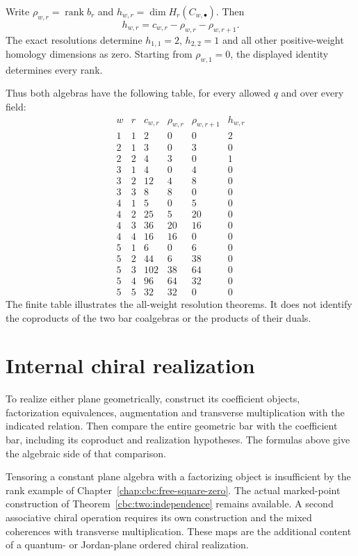 Write $\rho_{w,r}=\operatorname{rank}b_r$ and $h_{w,r}=\dim H_r(C_{w,\bullet})$.
Then
\[
 h_{w,r}=c_{w,r}-\rho_{w,r}-\rho_{w,r+1}.
\]
The exact resolutions determine $h_{1,1}=2$, $h_{2,2}=1$ and all other positive-weight homology dimensions as zero.
Starting from $\rho_{w,1}=0$, the displayed identity determines every rank.

Thus both algebras have the following table, for every allowed $q$ and over every field:
\[
\begin{array}{cc|rrrr}
 w&r&c_{w,r}&\rho_{w,r}&\rho_{w,r+1}&h_{w,r}\\ \hline
 1&1&2&0&0&2\\
 2&1&3&0&3&0\\
 2&2&4&3&0&1\\
 3&1&4&0&4&0\\
 3&2&12&4&8&0\\
 3&3&8&8&0&0\\
 4&1&5&0&5&0\\
 4&2&25&5&20&0\\
 4&3&36&20&16&0\\
 4&4&16&16&0&0\\
 5&1&6&0&6&0\\
 5&2&44&6&38&0\\
 5&3&102&38&64&0\\
 5&4&96&64&32&0\\
 5&5&32&32&0&0
\end{array}
\]
The finite table illustrates the all-weight resolution theorems.
It does not identify the coproducts of the two bar coalgebras or the products of their duals.

\section{Internal chiral realization}

To realize either plane geometrically, construct its coefficient objects, factorization equivalences, augmentation and transverse multiplication with the indicated relation.
Then compare the entire geometric bar with the coefficient bar, including its coproduct and realization hypotheses.
The formulas above give the algebraic side of that comparison.

Tensoring a constant plane algebra with a factorizing object is insufficient by the rank example of Chapter~\ref{chap:cbc:free-square-zero}.
The actual marked-point construction of Theorem~\ref{cbc:two:independence} remains available.
A second associative chiral operation requires its own construction and the mixed coherences with transverse multiplication.
These maps are the additional content of a quantum- or Jordan-plane ordered chiral realization.

